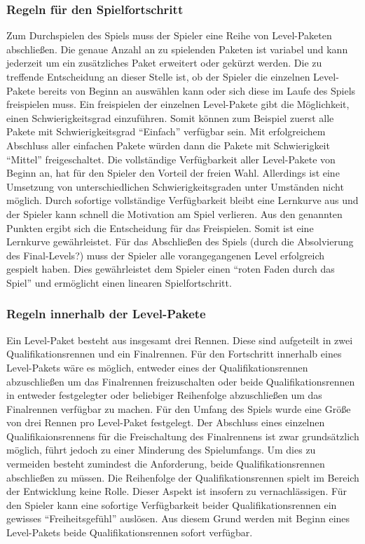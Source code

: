 	\subsubsection{Regeln für den Spielfortschritt}
	Zum Durchspielen des Spiels muss der Spieler eine Reihe von Level-Paketen abschließen. Die genaue Anzahl an zu spielenden Paketen ist variabel und kann jederzeit um ein zusätzliches Paket erweitert oder gekürzt werden. Die zu treffende Entscheidung an dieser Stelle ist, ob der Spieler die einzelnen Level-Pakete bereits von Beginn an auswählen kann oder sich diese im Laufe des Spiels freispielen muss. Ein freispielen der einzelnen Level-Pakete gibt die Möglichkeit, einen Schwierigkeitsgrad einzuführen. Somit können zum Beispiel zuerst alle Pakete mit Schwierigkeitsgrad \enquote{Einfach} verfügbar sein. Mit erfolgreichem Abschluss aller einfachen Pakete würden dann die Pakete mit Schwierigkeit \enquote{Mittel} freigeschaltet.
	Die vollständige Verfügbarkeit aller Level-Pakete von Beginn an, hat für den Spieler den Vorteil der freien Wahl. Allerdings ist eine Umsetzung von unterschiedlichen Schwierigkeitsgraden unter Umständen nicht möglich. Durch sofortige vollständige Verfügbarkeit bleibt eine Lernkurve aus und der Spieler kann schnell die Motivation am Spiel verlieren.
	Aus den genannten Punkten ergibt sich die Entscheidung für das Freispielen. Somit ist eine Lernkurve gewährleistet. Für das Abschließen des Spiels (durch die Absolvierung des Final-Levels?) muss der Spieler alle vorangegangenen Level erfolgreich gespielt haben. Dies gewährleistet dem Spieler einen \enquote{roten Faden durch das Spiel} und ermöglicht einen linearen Spielfortschritt.

	\subsubsection{Regeln innerhalb der Level-Pakete}
	Ein Level-Paket besteht aus insgesamt drei Rennen. Diese sind aufgeteilt in zwei Qualifikationsrennen und ein Finalrennen. Für den Fortschritt innerhalb eines Level-Pakets wäre es möglich, entweder eines der Qualifikationsrennen abzuschließen um das Finalrennen freizuschalten oder beide Qualifikationsrennen in entweder festgelegter oder beliebiger Reihenfolge abzuschließen um das Finalrennen verfügbar zu machen.
	Für den Umfang des Spiels wurde eine Größe von drei Rennen pro Level-Paket festgelegt. Der Abschluss eines einzelnen Qualifikaionsrennens für die Freischaltung des Finalrennens ist zwar grundsätzlich möglich, führt jedoch zu einer Minderung des Spielumfangs. Um dies zu vermeiden besteht zumindest die Anforderung, beide Qualifikationsrennen abschließen zu müssen. Die Reihenfolge der Qualifikationsrennen spielt im Bereich der Entwicklung keine Rolle. Dieser Aspekt ist insofern zu vernachlässigen. Für den Spieler kann eine sofortige Verfügbarkeit beider Qualifikationsrennen ein gewisses \enquote{Freiheitsgefühl} auslösen. Aus diesem Grund werden mit Beginn eines Level-Pakets beide Qualifikationsrennen sofort verfügbar.

